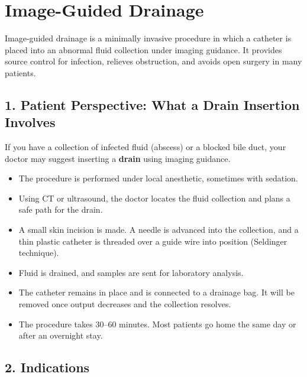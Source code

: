\chapter{Image-Guided Drainage}

\label{ch:ch78_drainage}

Image-guided drainage is a minimally invasive procedure in which a catheter is placed into an abnormal fluid collection under imaging guidance. It provides source control for infection, relieves obstruction, and avoids open surgery in many patients.


\section{1. Patient Perspective: What a Drain Insertion Involves}

If you have a collection of infected fluid (abscess) or a blocked bile duct, your doctor may suggest inserting a \textbf{drain} using imaging guidance.

\begin{itemize}
  \item The procedure is performed under local anesthetic, sometimes with sedation.
  \item Using CT or ultrasound, the doctor locates the fluid collection and plans a safe path for the drain.
  \item A small skin incision is made. A needle is advanced into the collection, and a thin plastic catheter is threaded over a guide wire into position (Seldinger technique).
  \item Fluid is drained, and samples are sent for laboratory analysis.
  \item The catheter remains in place and is connected to a drainage bag. It will be removed once output decreases and the collection resolves.
  \item The procedure takes 30--60 minutes. Most patients go home the same day or after an overnight stay.
\end{itemize}


\section{2. Indications}

